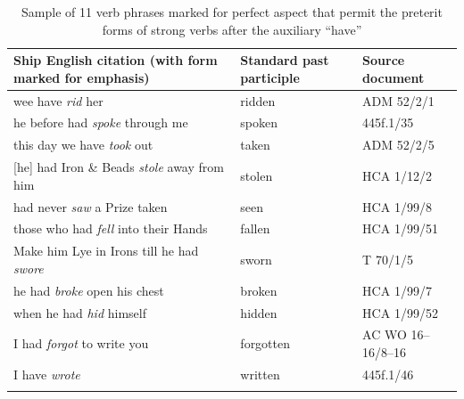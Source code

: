 \begin{table}
\caption{\label{tab:key:6.2} Sample of 11 verb phrases marked for perfect aspect that permit the preterit forms of strong verbs after the auxiliary “have”}
\small
\begin{tabularx}{\textwidth}{Qp{20mm}l}
\lsptoprule

\textbf{Ship English citation}\newline 
(with  form marked for emphasis) & \textbf{Standard past participle} & \textbf{Source document}\\
\midrule 
wee have \textit{rid} her & ridden & ADM 52/2/1\\
he before had \textit{spoke} through me & spoken & 445f.1/35\\
this day we have \textit{took} out & taken & ADM 52/2/5\\{}
[he] had Iron \& Beads \textit{stole} away from him & stolen & HCA 1/12/2\\
had never \textit{saw} a Prize taken & seen & HCA 1/99/8\\
those who had \textit{fell} into their Hands & fallen & HCA 1/99/51\\
Make him Lye in Irons till he had \textit{swore} & sworn & T 70/1/5\\
he had \textit{broke} open his chest & broken & HCA 1/99/7\\
when he had \textit{hid} himself & hidden & HCA 1/99/52\\
I had \textit{forgot} to write you & forgotten & AC WO 16–16/8–16\\
I have \textit{wrote} & written & 445f.1/46\\
\lspbottomrule
\end{tabularx}\end{table}


